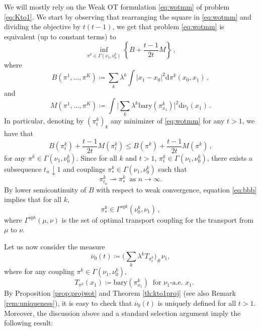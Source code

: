 \documentclass[12pt]{amsart}
\numberwithin{equation}{section}
\let\mr=\mathrm
\def\ed{\mathrm{d}}
\theoremstyle{plain}
\theoremstyle{definition}
\begin{document}
We will mostly rely on the Weak OT formulation \eqref{eq:wotmm} of problem \eqref{eq:Kto1}. We start by observing that rearranging the square in \eqref{eq:wotmm} and dividing the objective by $t(t-1)$, we get that problem \eqref{eq:wotmm} is equivalent (up to constant terms) to
\begin{equation}\label{eq:Bproblem}
\inf_{\pi^k\in \Gamma(\nu_1,\nu_0^k)} \left\{ B + \frac{t-1}{2t} M\right\}\,, 
\end{equation}
where
\[
B(\pi^1,\ldots,\pi^K) \coloneqq \sum_k \lambda^k \int |x_1-x_0|^2\ed \pi^k(x_0,x_1)\,,
\]
and 
\begin{equation}\label{eq:M}
M(\pi^1,\ldots,\pi^K) \coloneqq \int  \Big|\sum_k \lambda^k \mathrm{bary}(\pi^k_{x_1})\Big|^2 \ed \nu_1(x_1) \,.
\end{equation}
In particular, denoting by $(\pi^k_t)_k$ any minimizer of \eqref{eq:wotmm} for any $t>1$, we have that 
\begin{equation}\label{eq:bbb}
 B(\pi_t^k) + \frac{t-1}{2t} M(\pi^k_t) \leq  B(\pi^k) + \frac{t-1}{2t} M(\pi^k)\,,
\end{equation}
for any $\pi^k \in \Gamma(\nu_1,\nu^k_0)$. Since for all $k$ and $t>1$, $\pi^k_t \in \Gamma(\nu_1,\nu_0^k)$, there exists a subsequence $t_n \downarrow 1$ and couplings $\pi_*^k \in \Gamma(\nu_1,\nu_0^k)$ such that 
\begin{equation}\label{eq:pilim}
\pi^k_{t_n} \rightharpoonup \pi_*^k  ~\text{ as } n\rightarrow \infty.
\end{equation}
By lower semicontinuity of $B$ with respect to weak convergence, equation \eqref{eq:bbb} implies that for all $k$,  \[
\pi_*^k \in \Gamma^{\mr{opt}}(\nu^k_0,\nu_1)\,,\]
where $\Gamma^{\mr{opt}}(\mu,\nu)$ is the set of optimal transport coupling for the transport from $\mu$ to $\nu$. 

Let us now consider the measure
\begin{equation}\label{eq:nu0t}
\overline{\nu}_0(t) \coloneqq \Big(\sum_k \lambda ^k T_{\pi^k_t} \Big)_\# \nu_1,
\end{equation}
where for any coupling $\pi^k \in \Gamma(\nu_1,\nu_0^k)$,
\begin{equation}\label{eq:Tkdef} \quad T_{\pi^k}(x_1) \coloneqq \mr{bary}(\pi^k_{x_1}) ~\text{ for $\nu_1$-a.e. }x_1.
\end{equation}
By Proposition \ref{prop:projwot} and Theorem \ref{th:kto1proj} (see also Remark \ref{rem:uniqueness}), it is easy to check that $\overline{\nu}_0(t)$ is uniquely defined for all $t>1$. Moreover, the discussion above and a standard selection argument imply the following result:
\end{document}
